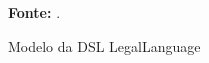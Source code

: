 \begin{figure}[ht!]
\centering

\caption{\textmd{Modelo da DSL LegalLanguage}}
\label{fig:legallanguagemodel}

\par\medskip\textbf{Fonte:} \cite{legallanguage}. \par\medskip

\end{figure}

